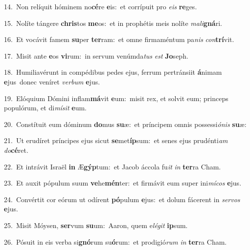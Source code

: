 {\numbfont\textcolor{\numbcolor}{14.}}~Non relíquit hóminem no\-\textbf{cé}\-re \textbf{e}\-is:~\star et corrípuit pro \textit{e}\-\textit{is} \textbf{re}\-ges.\par
{\numbfont\textcolor{\numbcolor}{15.}}~Nolíte tángere \textbf{chris}\-tos \textbf{me}\-os:~\star et in prophétis meis nolíte \textit{ma}\-\textit{li}\textbf{gná}ri.\par
{\numbfont\textcolor{\numbcolor}{16.}}~Et vocávit famem \textbf{su}\-per \textbf{ter}\-ram:~\star et omne firmaméntum pa\textit{nis} \textit{con}\-\textbf{trí}vit.\par
{\numbfont\textcolor{\numbcolor}{17.}}~Misit ante \textbf{e}\-os \textbf{vi}\-rum:~\star in servum venúmda\textit{tus} \textit{est} \textbf{Jo}\-seph.\par
{\numbfont\textcolor{\numbcolor}{18.}}~Humiliavérunt in compédibus pedes ejus, ferrum pertránsiit \textbf{á}\-nimam \textbf{e}\-jus~\star donec veníret \textit{ver}\-\textit{bum} \textbf{e}\-jus.\par
{\numbfont\textcolor{\numbcolor}{19.}}~Elóquium Dómini inflam\-\textbf{má}\-vit \textbf{e}\-um:~\star misit rex, et solvit eum; princeps populórum, et di\-\textit{mí}\-\textit{sit} \textbf{e}\-um.\par
{\numbfont\textcolor{\numbcolor}{20.}}~Constítuit eum dóminum \textbf{do}\-mus \textbf{su}\-æ:~\star et príncipem omnis possessi\-\textit{ó}\-\textit{nis} \textbf{su}\-æ:\par
{\numbfont\textcolor{\numbcolor}{21.}}~Ut erudíret príncipes ejus sicut \textbf{se}\-met\-\textbf{íp}\-sum:~\star et senes ejus prudénti\textit{am} \textit{do}\-\textbf{cé}ret.\par
{\numbfont\textcolor{\numbcolor}{22.}}~Et intrávit Israël \textbf{in} Æ\-\textbf{gýp}\-tum:~\star et Jacob áccola fu\textit{it} \textit{in} \textbf{ter}\-ra Cham.\par
{\numbfont\textcolor{\numbcolor}{23.}}~Et auxit pópulum suum \textbf{ve}\-he\-\textbf{mén}\-ter:~\star et firmávit eum super ini\-\textit{mí}\-\textit{cos} \textbf{e}\-jus.\par
{\numbfont\textcolor{\numbcolor}{24.}}~Convértit cor eórum ut odírent \textbf{pó}\-pulum \textbf{e}\-jus:~\star et dolum fácerent in \textit{ser}\-\textit{vos} \textbf{e}\-jus.\par
{\numbfont\textcolor{\numbcolor}{25.}}~Misit Móysen, \textbf{ser}\-vum \textbf{su}\-um:~\star Aaron, quem e\-\textit{lé}\-\textit{git} \textbf{ip}\-sum.\par
{\numbfont\textcolor{\numbcolor}{26.}}~Pósuit in eis verba si\-\textbf{gnó}\-rum su\-\textbf{ó}\-rum:~\star et prodigió\textit{rum} \textit{in} \textbf{ter}\-ra Cham.\par

